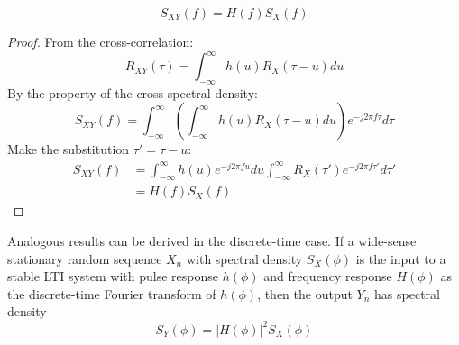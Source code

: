 \documentclass[11pt]{report} %
\begin{document}
\begin{equation}
S_{XY}\left(f\right) = H\left(f\right)S_{X}\left(f\right)
\end{equation}
\begin{proof}
From the cross-correlation:
\begin{equation}
R_{XY}\left(\tau\right) = \int_{-\infty}^{\infty}h\left(u\right)R_{X}\left(\tau-u\right)du
\end{equation}
By the property of the cross spectral density:
\begin{equation}
S_{XY}\left(f\right) = \int_{-\infty}^{\infty}\left(\int_{-\infty}^{\infty}h\left(u\right)R_{X}\left(\tau-u\right)du\right)e^{-j2\pi f\tau}d\tau
\end{equation}
Make the substitution $\tau' = \tau - u$:
\begin{align}
S_{XY}\left(f\right) &= \int_{-\infty}^{\infty}h\left(u\right)e^{-j2\pi fu}du\int_{-\infty}^{\infty}R_{X}\left(\tau'\right)e^{-j2\pi f\tau'}d\tau' \\
&= H\left(f\right)S_{X}\left(f\right)
\end{align}
\end{proof}
Analogous results can be derived in the discrete-time case. If a wide-sense stationary random sequence $X_{n}$ with spectral density $S_{X}\left(\phi\right)$ is the input to a stable LTI system with pulse response $h\left(\phi\right)$ and frequency response $H\left(\phi\right)$ as the discrete-time Fourier transform of $h\left(\phi\right)$, then the output $Y_{n}$ has spectral density
\begin{equation}
S_{Y}\left(\phi\right) = \left|H\left(\phi\right)\right|^{2}S_{X}\left(\phi\right)
\end{equation}
\end{document}
